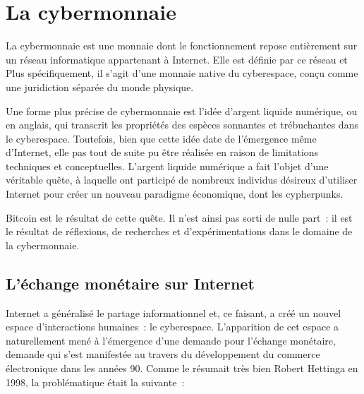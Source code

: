 
\chapter{La cybermonnaie}
\label{ch:cybermonnaie}

La cybermonnaie est une monnaie dont le fonctionnement repose entièrement sur un réseau informatique appartenant à Internet. Elle est définie par ce réseau et  Plus spécifiquement, il s'agit d'une monnaie native du cyberespace, conçu comme une juridiction séparée du monde physique.

Une forme plus précise de cybermonnaie est l'idée d'argent liquide numérique, ou  en anglais, qui transcrit les propriétés des espèces sonnantes et trébuchantes dans le cyberespace. Toutefois, bien que cette idée date de l'émergence même d'Internet, elle pas tout de suite pu être réalisée en raison de limitations techniques et conceptuelles. L'argent liquide numérique a fait l'objet d'une véritable quête, à laquelle ont participé de nombreux individus désireux d'utiliser Internet pour créer un nouveau paradigme économique, dont les cypherpunks.

Bitcoin est le résultat de cette quête. Il n'est ainsi pas sorti de nulle part~: il est le résultat de réflexions, de recherches et d'expérimentations dans le domaine de la cybermonnaie.

\section*{L'échange monétaire sur Internet}

Internet a généralisé le partage informationnel et, ce faisant, a créé un nouvel espace d'interactions humaines~: le cyberespace. L'apparition de cet espace a naturellement mené à l'émergence d'une demande pour l'échange monétaire, demande qui s'est manifestée au travers du développement du commerce électronique dans les années 90. Comme le résumait très bien Robert Hettinga en 1998, la problématique était la suivante~:

